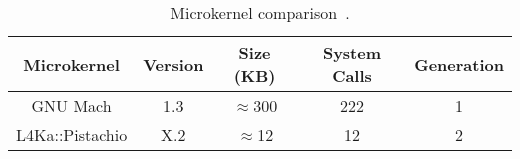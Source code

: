 	\begin{table}[tb]
	\begin{center}
	\begin{tabular}{|c|c|c|c|c|}
	  \toprule
	  \bf Microkernel & \bf Version & \bf Size (KB) &
	  \bf System Calls & \bf Generation\\
	  \midrule
	  GNU Mach & 1.3 & $\approx$300 & 222 & 1\\
	  L4Ka::Pistachio & X.2 & $\approx$12 & 12 & 2\\
	  \bottomrule
	\end{tabular}
	\end{center}
	\caption{Microkernel comparison~\cite{mach_ref_2001,l4ref2005}.}
	\label{tab:microkernel_comparison}
	\end{table}
